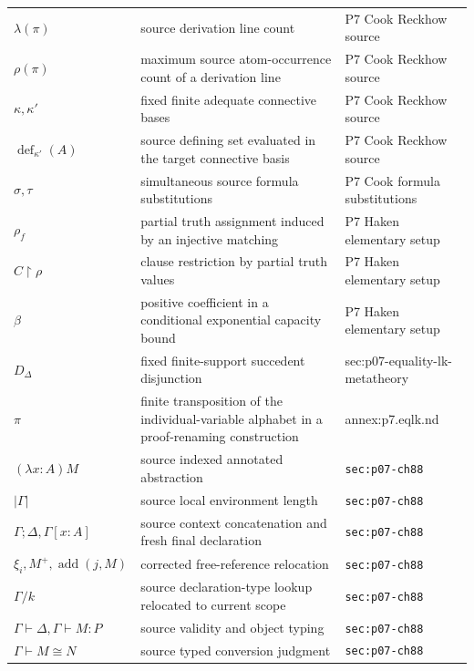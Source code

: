 \begin{longtable}{@{}p{}p{}p{}@{}}
\(\lambda(\pi)\) & source derivation line count & P7 Cook Reckhow source \\
\(\rho(\pi)\) & maximum source atom-occurrence count of a derivation line & P7 Cook Reckhow source \\
\(\kappa,\allowbreak \kappa'\) & fixed finite adequate connective bases & P7 Cook Reckhow source \\
\(\operatorname{def}_{\kappa'}(A)\) & source defining set evaluated in the target connective basis & P7 Cook Reckhow source \\
\(\sigma,\allowbreak \tau\) & simultaneous source formula substitutions & P7 Cook formula substitutions \\
\(\rho_f\) & partial truth assignment induced by an injective matching & P7 Haken elementary setup \\
\(C\upharpoonright\rho\) & clause restriction by partial truth values & P7 Haken elementary setup \\
\(\beta\) & positive coefficient in a conditional exponential capacity bound & P7 Haken elementary setup \\
\(D_\Delta\) & fixed finite-support succedent disjunction & sec:\allowbreak{}p07-\allowbreak{}equality-\allowbreak{}lk-\allowbreak{}metatheory \\
\(\pi\) & finite transposition of the individual-variable alphabet in a proof-renaming construction & annex:\allowbreak{}p7.\allowbreak{}eqlk.\allowbreak{}nd \\
\((\lambda x:A)M\) & source indexed annotated abstraction & \texttt{sec:\allowbreak{}p07-\allowbreak{}ch88} \\
\(|\Gamma|\) & source local environment length & \texttt{sec:\allowbreak{}p07-\allowbreak{}ch88} \\
\(\Gamma;\allowbreak \Delta,\allowbreak \Gamma[x:A]\) & source context concatenation and fresh final declaration & \texttt{sec:\allowbreak{}p07-\allowbreak{}ch88} \\
\(\xi_i,\allowbreak M^+,\allowbreak \operatorname{add}(j,\allowbreak M)\) & corrected free-reference relocation & \texttt{sec:\allowbreak{}p07-\allowbreak{}ch88} \\
\(\Gamma/k\) & source declaration-type lookup relocated to current scope & \texttt{sec:\allowbreak{}p07-\allowbreak{}ch88} \\
\(\Gamma\vdash\Delta,\allowbreak \Gamma\vdash M:P\) & source validity and object typing & \texttt{sec:\allowbreak{}p07-\allowbreak{}ch88} \\
\(\Gamma\vdash M\cong N\) & source typed conversion judgment & \texttt{sec:\allowbreak{}p07-\allowbreak{}ch88} \\

\end{longtable}
